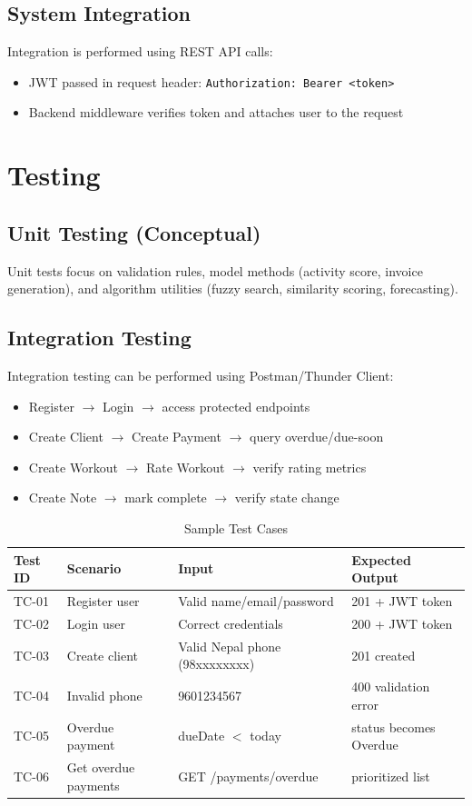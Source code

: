 \documentclass[12pt,a4paper]{report}
\begin{document}
\subsection{System Integration}
Integration is performed using REST API calls:
\begin{itemize}[leftmargin=*]
  \item JWT passed in request header: \texttt{Authorization: Bearer <token>}
  \item Backend middleware verifies token and attaches user to the request
\end{itemize}

\section{Testing}
\subsection{Unit Testing (Conceptual)}
Unit tests focus on validation rules, model methods (activity score, invoice generation), and algorithm utilities (fuzzy search, similarity scoring, forecasting).

\subsection{Integration Testing}
Integration testing can be performed using Postman/Thunder Client:
\begin{itemize}[leftmargin=*]
  \item Register \(\rightarrow\) Login \(\rightarrow\) access protected endpoints
  \item Create Client \(\rightarrow\) Create Payment \(\rightarrow\) query overdue/due-soon
  \item Create Workout \(\rightarrow\) Rate Workout \(\rightarrow\) verify rating metrics
  \item Create Note \(\rightarrow\) mark complete \(\rightarrow\) verify state change
\end{itemize}

\begin{table}[h]
\centering
\caption{Sample Test Cases}
\begin{tabular}{@{}p{1.4cm}p{4.0cm}p{5.0cm}p{4.2cm}@{}}
\toprule
\textbf{Test ID} & \textbf{Scenario} & \textbf{Input} & \textbf{Expected Output} \\
\midrule
TC-01 & Register user & Valid name/email/password & 201 + JWT token \\
TC-02 & Login user & Correct credentials & 200 + JWT token \\
TC-03 & Create client & Valid Nepal phone (98xxxxxxxx) & 201 created \\
TC-04 & Invalid phone & 9601234567 & 400 validation error \\
TC-05 & Overdue payment & dueDate $<$ today & status becomes Overdue \\
TC-06 & Get overdue payments & GET /payments/overdue & prioritized list \\
\bottomrule
\end{tabular}
\end{table}
\end{document}
